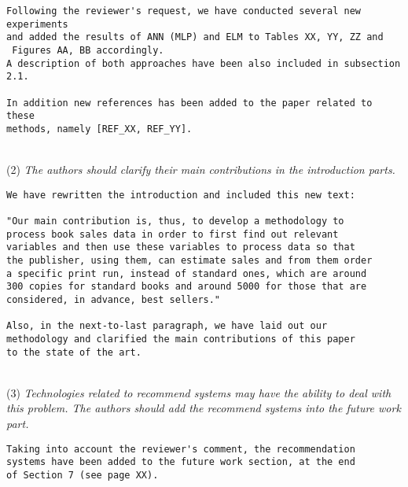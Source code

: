 \documentclass[preprint]{elsarticle}
\begin{document}
\begin{verbatim}
Following the reviewer's request, we have conducted several new experiments 
and added the results of ANN (MLP) and ELM to Tables XX, YY, ZZ and
 Figures AA, BB accordingly. 
A description of both approaches have been also included in subsection 2.1.

In addition new references has been added to the paper related to these 
methods, namely [REF_XX, REF_YY].
\end{verbatim}


~\\
\noindent (2) \emph{The authors should clarify their main contributions in the introduction parts.}

\begin{verbatim}
We have rewritten the introduction and included this new text:

"Our main contribution is, thus, to develop a methodology to 
process book sales data in order to first find out relevant 
variables and then use these variables to process data so that 
the publisher, using them, can estimate sales and from them order 
a specific print run, instead of standard ones, which are around 
300 copies for standard books and around 5000 for those that are 
considered, in advance, best sellers."

Also, in the next-to-last paragraph, we have laid out our 
methodology and clarified the main contributions of this paper 
to the state of the art.
\end{verbatim}


~\\
\noindent (3) \emph{Technologies related to recommend systems may have the ability to deal with this problem. The authors should add the recommend systems into the future work part. } 

\begin{verbatim}
Taking into account the reviewer's comment, the recommendation 
systems have been added to the future work section, at the end 
of Section 7 (see page XX).
\end{verbatim}
\end{document}
